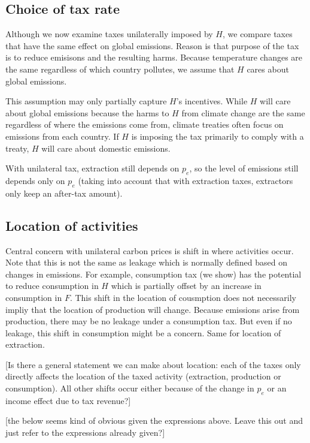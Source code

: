 \documentclass[notitlepage,12pt]{article}
\begin{document}
\subsection{Choice of tax rate}

Although we now examine taxes unilaterally imposed by $H$, we compare taxes
that have the same effect on global emissions. Reason is that purpose of the
tax is to reduce emisisons and the resulting harms. Because temperature
changes are the same regardless of which country pollutes, we assume that $H$
cares about global emissions.

This assumption may only partially capture $H$'s incentives. While $H$ will
care about global emissions because the harms to $H$ from climate change are
the same regardless of where the emissions come from, climate treaties often
focus on emissions from each country. If $H$ is imposing the tax primarily
to comply with a treaty, $H$ will care about domestic emissions.

With unilateral tax, extraction still depends on $p_{e}$, so the level of
emissions still depends only on $p_{e}$ (taking into account that with
extraction taxes, extractors only keep an after-tax amount). 

\subsection{Location of activities}

Central concern with unilateral carbon prices is shift in where activities
occur. Note that this is not the same as leakage which is normally defined
based on changes in emissions. For example, consumption tax (we show) has
the potential to reduce consumption in $H$ which is partially offset by an
increase in consumption in $F$. This shift in the location of cousmption
does not necessarily impliy that the location of production will change.
Because emissions arise from production, there may be no leakage under a
consumption tax. But even if no leakage, this shift in consumption might be
a concern. Same for location of extraction.

[Is there a general statement we can make about location: each of the taxes
only directly affects the location of the taxed activity (extraction,
production or consumption). All other shifts occur either because of the
change in $p_{e}$ or an income effect due to tax revenue?]

[the below seems kind of obvious given the expressions above. Leave this out
and just refer to the expressions already given?]
\end{document}
